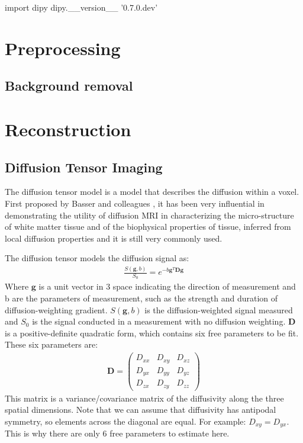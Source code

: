 \documentclass{bioinfo}
\begin{document}
\begin{python}
import dipy
dipy.__version__
'0.7.0.dev'
\end{python}

\section{Preprocessing}

\subsection{Background removal}

\section{Reconstruction}

\subsection{Diffusion Tensor Imaging}

The diffusion tensor model is a model that describes the diffusion within a
voxel. First proposed by Basser and colleagues \citep{basser-mattiello-etal:94}, it has been very
influential in demonstrating the utility of diffusion MRI in characterizing the
micro-structure of white matter tissue and of the biophysical properties of
tissue, inferred from local diffusion properties and it is still very commonly
used.

The diffusion tensor models the diffusion signal as:
\begin{eqnarray*}
\frac{S(\mathbf{g}, b)}{S_0} = e^{-b\mathbf{g}^T \mathbf{D} \mathbf{g}}
\end{eqnarray*}
Where $\mathbf{g}$ is a unit vector in 3 space indicating the direction of
measurement and b are the parameters of measurement, such as the strength and
duration of diffusion-weighting gradient. $S(\mathbf{g}, b)$ is the
diffusion-weighted signal measured and $S_0$ is the signal conducted in a
measurement with no diffusion weighting. $\mathbf{D}$ is a positive-definite quadratic
form, which contains six free parameters to be fit. These six parameters are:
\begin{eqnarray*}
\mathbf{D} = \begin{pmatrix}
D_{xx} & D_{xy} & D_{xz} \\ 
D_{yx} & D_{yy} & D_{yz} \\ 
D_{zx} & D_{zy} & D_{zz}
\end{pmatrix}
\end{eqnarray*}
This matrix is a variance/covariance matrix of the diffusivity along the three
spatial dimensions. Note that we can assume that diffusivity has antipodal
symmetry, so elements across the diagonal are equal. For example:
$D_{xy} = D_{yx}$. This is why there are only 6 free parameters to estimate
here.
\end{document}
